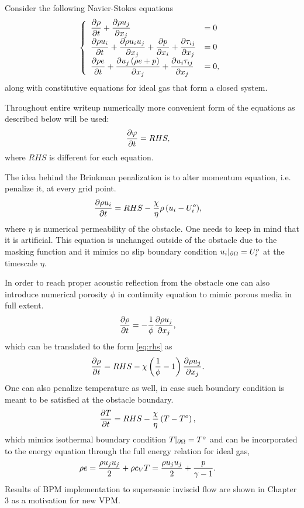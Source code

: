 Consider the following Navier-Stokes equations
\begin{align}
\left\{\begin{array}{ll}
\displaystyle \frac {\partial \rho}{\partial t} + \frac {\partial \rho u_j}{\partial x_j} &= 0 \\
\displaystyle \frac {\partial \rho u_i}{\partial t} + \frac {\partial \rho u_i u_j}{\partial x_j} + \frac {\partial p}{\partial x_i} + \frac {\partial \tau_{ij}}{\partial x_j} &= 0\\
\displaystyle \frac {\partial \rho e}{\partial t} + \frac {\partial u_j \left(\rho e + p\right)}{\partial x_j} + \frac {\partial u_i \tau_{ij}}{\partial x_j} &= 0,
\end{array}\right.
\end{align}
along with constitutive equations for ideal gas that form a closed system.

Throughout entire writeup numerically more convenient form of the equations as described below will be used:
\begin{align}
\frac {\partial \varphi}{\partial t} &= RHS, \label{eq:rhs}
\end{align}
where $RHS$ is different for each equation.

The idea behind the Brinkman penalization is to alter momentum equation, i.e. penalize it, at every grid point. 
\begin{align}
\frac {\partial \rho u_i}{\partial t} &= RHS - \frac \chi \eta {\rho \left(u_i - U_i^o\right)},
\end{align}
where $\eta$ is numerical permeability of the obstacle. One needs to keep in mind that it is artificial. This equation is unchanged outside of the obstacle due to the masking function and it mimics no slip boundary condition $u_i|_{\partial \Omega} = U_i^o$ at the timescale $\eta$. 

In order to reach proper acoustic reflection from the obstacle one can also introduce numerical porosity $\phi$ in continuity equation to mimic porous media in full extent.
\begin{align}
\nonumber
\frac {\partial \rho}{\partial t} &= -\frac 1\phi \frac {\partial \rho u_j}{\partial x_j},
\end{align}
which can be translated to the form \eqref{eq:rhs} as 
\begin{align}
\frac {\partial \rho}{\partial t} &= RHS - \chi \left(\frac 1\phi - 1\right) \frac {\partial \rho u_j}{\partial x_j}. \label{eq:poro_den}
\end{align}
One can also penalize temperature as well, in case such boundary condition is meant to be satisfied at the obstacle boundary.
\begin{align}
\frac {\partial T}{\partial t} &= RHS - \frac \chi \eta \left(T - T^o\right),
\end{align}
which mimics isothermal boundary condition $T|_{\partial \Omega} = T^o$ and can be incorporated to the energy equation through the full energy relation for ideal gas,
\begin{align}
\rho e &= \frac {\rho u_j u_j}2 + \rho c_VT = \frac {\rho u_j u_j}2 + \frac p{\gamma - 1} \label{eq:igeos}.
\end{align}
Results of BPM implementation to supersonic inviscid flow are shown in Chapter 3 as a motivation for new VPM.

